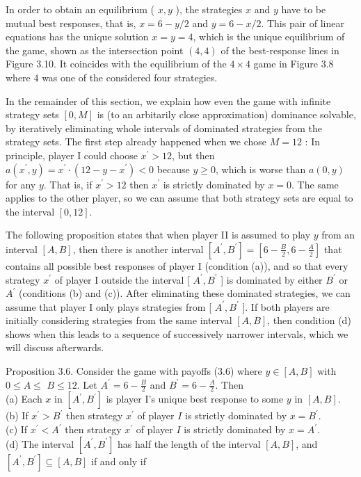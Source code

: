 \documentclass[12pt]{article}
\begin{document}
In order to obtain an equilibrium ( $x, y$ ), the strategies $x$ and $y$ have to be mutual best responses, that is, $x=6-y / 2$ and $y=6-x / 2$. This pair of linear equations has the unique solution $x=y=4$, which is the unique equilibrium of the game, shown as the intersection point $(4,4)$ of the best-response lines in Figure 3.10. It coincides with the equilibrium of the $4 \times 4$ game in Figure 3.8 where 4 was one of the considered four strategies.

In the remainder of this section, we explain how even the game with infinite strategy sets $[0, M]$ is (to an arbitarily close approximation) dominance solvable,\\
by iteratively eliminating whole intervals of dominated strategies from the strategy sets. The first step already happened when we chose $M=12$ : In principle, player I could choose $x^{\prime}>12$, but then $a\left(x^{\prime}, y\right)=x^{\prime} \cdot\left(12-y-x^{\prime}\right)<0$ because $y \geq 0$, which is worse than $a(0, y)$ for any $y$. That is, if $x^{\prime}>12$ then $x^{\prime}$ is strictly dominated by $x=0$. The same applies to the other player, so we can assume that both strategy sets are equal to the interval $[0,12]$.

The following proposition states that when player II is assumed to play $y$ from an interval $[A, B]$, then there is another interval $\left[A^{\prime}, B^{\prime}\right]=\left[6-\frac{B}{2}, 6-\frac{A}{2}\right]$ that contains all possible best responses of player I (condition (a)), and so that every strategy $x^{\prime}$ of player I outside the interval [ $A^{\prime}, B^{\prime}$ ] is dominated by either $B^{\prime}$ or $A^{\prime}$ (conditions (b) and (c)). After eliminating these dominated strategies, we can assume that player I only plays strategies from [ $A^{\prime}, B^{\prime}$ ]. If both players are initially considering strategies from the same interval $[A, B]$, then condition (d) shows when this leads to a sequence of successively narrower intervals, which we will discuss afterwards.

Proposition 3.6. Consider the game with payoffs (3.6) where $y \in[A, B]$ with $0 \leq A \leq$ $B \leq 12$. Let $A^{\prime}=6-\frac{B}{2}$ and $B^{\prime}=6-\frac{A}{2}$. Then\\
(a) Each $x$ in $\left[A^{\prime}, B^{\prime}\right]$ is player I's unique best response to some $y$ in $[A, B]$.\\
(b) If $x^{\prime}>B^{\prime}$ then strategy $x^{\prime}$ of player $I$ is strictly dominated by $x=B^{\prime}$.\\
(c) If $x^{\prime}<A^{\prime}$ then strategy $x^{\prime}$ of player $I$ is strictly dominated by $x=A^{\prime}$.\\
(d) The interval $\left[A^{\prime}, B^{\prime}\right]$ has half the length of the interval $[A, B]$, and $\left[A^{\prime}, B^{\prime}\right] \subseteq[A, B]$ if and only if
\end{document}
